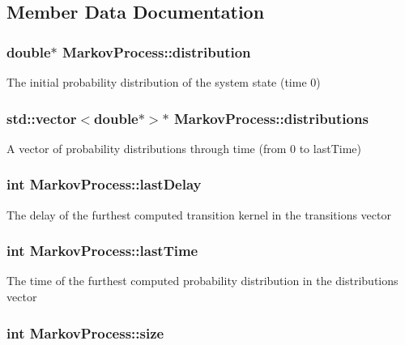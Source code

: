 \subsection{Member Data Documentation}
\hypertarget{class_markov_process_ab08fd1641b1f866be6a7e3dcca7ed575}{
\subsubsection[{distribution}]{\setlength{\rightskip}{0pt plus 5cm}double$\ast$ Markov\-Process\-::distribution}}\label{class_markov_process_ab08fd1641b1f866be6a7e3dcca7ed575}
The initial probability distribution of the system state (time 0) \hypertarget{class_markov_process_a8e5ced320dd6b0a41c2f38f316c37cbf}{
\subsubsection[{distributions}]{\setlength{\rightskip}{0pt plus 5cm}std\-::vector$<$double$\ast$$>$$\ast$ Markov\-Process\-::distributions}}\label{class_markov_process_a8e5ced320dd6b0a41c2f38f316c37cbf}
A vector of probability distributions through time (from 0 to last\-Time) \hypertarget{class_markov_process_a5fa10a819200afd87b558332b6e351a6}{
\subsubsection[{last\-Delay}]{\setlength{\rightskip}{0pt plus 5cm}int Markov\-Process\-::last\-Delay}}\label{class_markov_process_a5fa10a819200afd87b558332b6e351a6}
The delay of the furthest computed transition kernel in the transitions vector \hypertarget{class_markov_process_a5eddf681cb7bc196a248813ba42b516f}{
\subsubsection[{last\-Time}]{\setlength{\rightskip}{0pt plus 5cm}int Markov\-Process\-::last\-Time}}\label{class_markov_process_a5eddf681cb7bc196a248813ba42b516f}
The time of the furthest computed probability distribution in the distributions vector \hypertarget{class_markov_process_ad38170c3a73d113dc152e73bc57d0523}{
\subsubsection[{size}]{\setlength{\rightskip}{0pt plus 5cm}int Markov\-Process\-::size}}\label{class_markov_process_ad38170c3a73d113dc152e73bc57d0523}
